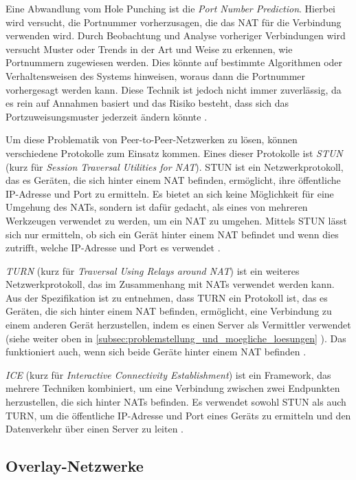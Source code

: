 Eine Abwandlung vom Hole Punching ist die \textit{Port Number Prediction}. Hierbei wird versucht, die Portnummer vorherzusagen, die das NAT für die Verbindung verwenden wird. Durch Beobachtung und Analyse vorheriger Verbindungen wird versucht Muster oder Trends in der Art und Weise zu erkennen, wie Portnummern zugewiesen werden. Dies könnte auf bestimmte Algorithmen oder Verhaltensweisen des Systems hinweisen, woraus dann die Portnummer vorhergesagt werden kann. Diese Technik ist jedoch nicht immer zuverlässig, da es rein auf Annahmen basiert und das Risiko besteht, dass sich das Portzuweisungsmuster jederzeit ändern könnte \Parencite[S. 7-21]{rfc5128_P2P_NATs}.

Um diese Problematik von Peer-to-Peer-Netzwerken zu lösen, können verschiedene Protokolle zum Einsatz kommen. Eines dieser Protokolle ist \textit{STUN} (kurz für \textit{Session Traversal Utilities for NAT}). STUN ist ein Netzwerkprotokoll, das es Geräten, die sich hinter einem NAT befinden, ermöglicht, ihre öffentliche IP-Adresse und Port zu ermitteln. Es bietet an sich keine Möglichkeit für eine Umgehung des NATs, sondern ist dafür gedacht, als eines von mehreren Werkzeugen verwendet zu werden, um ein NAT zu umgehen. Mittels STUN lässt sich nur ermitteln, ob sich ein Gerät hinter einem NAT befindet und wenn dies zutrifft, welche IP-Adresse und Port es verwendet \parencite[S. 4]{rfc8489_STUN}.

\textit{TURN} (kurz für \textit{Traversal Using Relays around NAT}) ist ein weiteres Netzwerkprotokoll, das im Zusammenhang mit NATs verwendet werden kann. Aus der Spezifikation ist zu entnehmen, dass TURN ein Protokoll ist, das es Geräten, die sich hinter einem NAT befinden, ermöglicht, eine Verbindung zu einem anderen Gerät herzustellen, indem es einen Server als Vermittler verwendet (siehe weiter oben in \ref{subsec:problemstellung_und_moegliche_loesungen} \textit{}). Das funktioniert auch, wenn sich beide Geräte hinter einem NAT befinden \parencite[S. 7]{rfc8656_TURN}.

\textit{ICE} (kurz für \textit{Interactive Connectivity Establishment}) ist ein Framework, das mehrere Techniken kombiniert, um eine Verbindung zwischen zwei Endpunkten herzustellen, die sich hinter NATs befinden. Es verwendet sowohl STUN als auch TURN, um die öffentliche IP-Adresse und Port eines Geräts zu ermitteln und den Datenverkehr über einen Server zu leiten \Parencite[S. 6]{rfc8445_ICE}.


\subsection{Overlay-Netzwerke}
\label{subsec:overlay_netzwerke}

